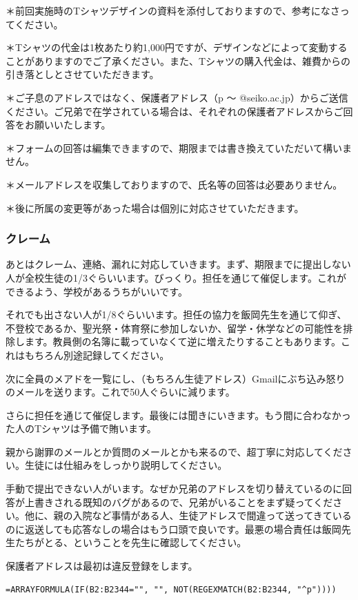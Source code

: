 \documentclass[a4paper]{ltjsreport}
\begin{document}
＊前回実施時のTシャツデザインの資料を添付しておりますので、参考になさってください。

＊Tシャツの代金は1枚あたり約1,000円ですが、デザインなどによって変動することがありますのでご了承ください。また、Tシャツの購入代金は、雑費からの引き落としとさせていただきます。

＊ご子息のアドレスではなく、保護者アドレス（p 〜 @seiko.ac.jp）からご送信ください。ご兄弟で在学されている場合は、それぞれの保護者アドレスからご回答をお願いいたします。

＊フォームの回答は編集できますので、期限までは書き換えていただいて構いません。

＊メールアドレスを収集しておりますので、氏名等の回答は必要ありません。

＊後に所属の変更等があった場合は個別に対応させていただきます。
\\

\subsubsection{クレーム}
あとはクレーム、連絡、漏れに対応していきます。まず、期限までに提出しない人が全校生徒の1/3ぐらいいます。びっくり。担任を通じて催促します。これができるよう、学校があるうちがいいです。

それでも出さない人が1/8ぐらいいます。担任の協力を飯岡先生を通じて仰ぎ、不登校であるか、聖光祭・体育祭に参加しないか、留学・休学などの可能性を排除します。教員側の名簿に載っていなくて逆に増えたりすることもあります。これはもちろん別途記録してください。

次に全員のメアドを一覧にし、（もちろん生徒アドレス）Gmailにぶち込み怒りのメールを送ります。これで50人ぐらいに減ります。

さらに担任を通じて催促します。最後には聞きにいきます。もう間に合わなかった人のTシャツは予備で賄います。

親から謝罪のメールとか質問のメールとかも来るので、超丁寧に対応してください。生徒には仕組みをしっかり説明してください。

手動で提出できない人がいます。なぜか兄弟のアドレスを切り替えているのに回答が上書きされる既知のバグがあるので、兄弟がいることをまず疑ってください。他に、親の入院など事情がある人、生徒アドレスで間違って送ってきているのに返送しても応答なしの場合はもう口頭で良いです。最悪の場合責任は飯岡先生たちがとる、ということを先生に確認してください。

保護者アドレスは最初は違反登録をします。

\begin{lstlisting}
=ARRAYFORMULA(IF(B2:B2344="", "", NOT(REGEXMATCH(B2:B2344, "^p"))))
\end{lstlisting}
\end{document}
